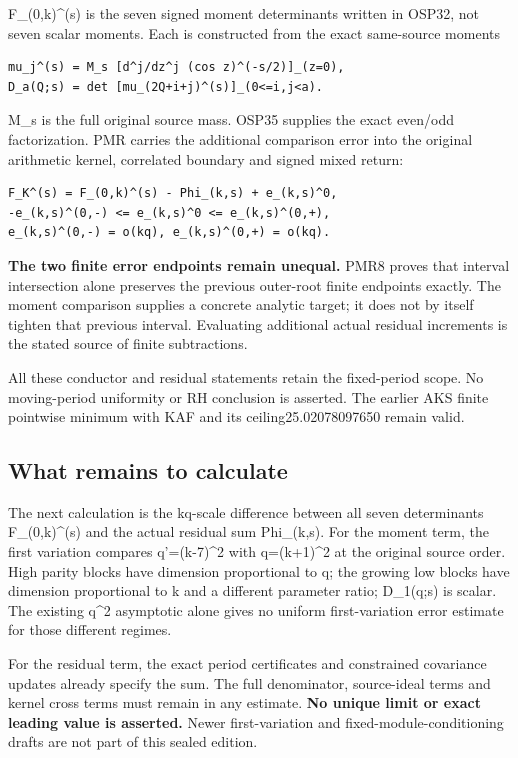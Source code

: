 \documentclass[
]{article}
\begin{document}
F\_(0,k)\^{}(s) is the seven signed moment determinants written in
OSP32, not seven scalar moments. Each is constructed from the exact
same-source moments

\begin{verbatim}
mu_j^(s) = M_s [d^j/dz^j (cos z)^(-s/2)]_(z=0),
D_a(Q;s) = det [mu_(2Q+i+j)^(s)]_(0<=i,j<a).
\end{verbatim}

M\_s is the full original source mass. OSP35 supplies the exact even/odd
factorization. PMR carries the additional comparison error into the
original arithmetic kernel, correlated boundary and signed mixed return:

\begin{verbatim}
F_K^(s) = F_(0,k)^(s) - Phi_(k,s) + e_(k,s)^0,
-e_(k,s)^(0,-) <= e_(k,s)^0 <= e_(k,s)^(0,+),
e_(k,s)^(0,-) = o(kq), e_(k,s)^(0,+) = o(kq).
\end{verbatim}

\textbf{The two finite error endpoints remain unequal.} PMR8 proves that
interval intersection alone preserves the previous outer-root finite
endpoints exactly. The moment comparison supplies a concrete analytic
target; it does not by itself tighten that previous interval. Evaluating
additional actual residual increments is the stated source of finite
subtractions.

All these conductor and residual statements retain the fixed-period
scope. No moving-period uniformity or RH conclusion is asserted. The
earlier AKS finite pointwise minimum with KAF and its
ceiling25.02078097650 remain valid.

\subsection{What remains to
calculate}\label{what-remains-to-calculate-4}

The next calculation is the kq-scale difference between all seven
determinants F\_(0,k)\^{}(s) and the actual residual sum Phi\_(k,s). For
the moment term, the first variation compares q'=(k-7)\^{}2 with
q=(k+1)\^{}2 at the original source order. High parity blocks have
dimension proportional to q; the growing low blocks have dimension
proportional to k and a different parameter ratio; D\_1(q;s) is scalar.
The existing q\^{}2 asymptotic alone gives no uniform first-variation
error estimate for those different regimes.

For the residual term, the exact period certificates and constrained
covariance updates already specify the sum. The full denominator,
source-ideal terms and kernel cross terms must remain in any estimate.
\textbf{No unique limit or exact leading value is asserted.} Newer
first-variation and fixed-module-conditioning drafts are not part of
this sealed edition.
\end{document}
